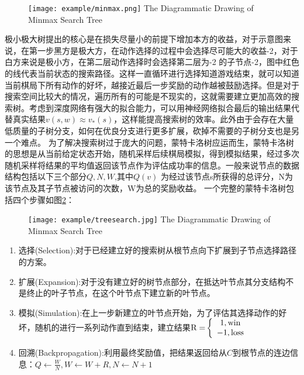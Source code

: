 \begin{figure}[!htp]
	\centering
	\texttt{[image: example/minmax.png]}
	{The Diagrammatic Drawing of Minmax Search Tree}
	\label{极小极大搜索树}
\end{figure}
极小极大树提出的核心是在损失尽量小的前提下增加本方的收益，对于示意图来说，在第一步黑方是极大方，在动作选择的过程中会选择尽可能大的收益-2，对于白方来说是极小方，在第二层动作选择时会选择第二层为-2 的子节点-2，图中红色的线代表当前状态的搜索路径。这样一直循环进行选择知道游戏结束，就可以知道当前棋局下所有动作的好坏，越接近最后一步奖励的动作越被鼓励选择。但是对于搜索空间比较大的情况，遍历所有的可能是不现实的，这就需要建立更加高效的搜索树。考虑到深度网络有强大的拟合能力，可以用神经网络拟合最后的输出结果代替真实结果$v(s,w) \approx {v_*}(s)$，这样能提高搜索树的效率。此外由于会存在大量低质量的子树分支，如何在优良分支进行更多扩展，砍掉不需要的子树分支也是另一个难点。
为了解决搜索树过于庞大的问题，蒙特卡洛树应运而生，蒙特卡洛树的思想是从当前给定状态开始，随机采样后续棋局模拟，得到模拟结果，经过多次随机采样将结果的平均值返回该节点作为评估成功率的信息。一般来说节点的数据结构包括以下三个部分${Q,N,W}$,其中$Q(v)$ 为经过该节点s所获得的总评分，N为该节点及其子节点被访问的次数，W为总的奖励收益。
一个完整的蒙特卡洛树包括四个步骤如图\ref{fig:treesearch}：

\begin{figure}[!htp]
	\centering
	\texttt{[image: example/treesearch.jpg]}
	{The Diagrammatic Drawing of Minmax Search Tree}
	\label{fig:treesearch}
\end{figure}
\begin{enumerate}
	\item 选择(Selection):对于已经建立好的搜索树从根节点向下扩展到子节点选择路径的方案。
	\item 扩展(Expansion):对于没有建立好的树节点部分，在抵达叶节点其分支结构不是终止的叶子节点，在这个叶节点下建立新的叶节点。
	\item 模拟(Simulation):在上一步新建立的叶节点开始，为了评估其选择动作的好坏，随机的进行一系列动作直到结束，建立结果${\rm{R = }}\left\{ {\begin{array}{*{20}{c}}
		{{\rm{1,win}}}\\
		{{\rm{ - 1,loss}}}
		\end{array}} \right.$
	\item 回溯(Backpropagation):利用最终奖励值，把结果返回给从$C$到根节点的连边信息：$Q \leftarrow \frac{W}{N},W \leftarrow W + R,N \leftarrow N + 1$
\end{enumerate}

